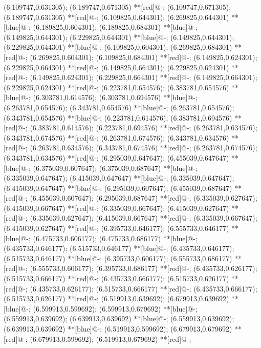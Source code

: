 (6.109747,0.631305); (6.189747,0.671305) **[red]@{-};
(6.109747,0.671305); (6.189747,0.631305) **[red]@{-};
(6.109825,0.644301); (6.269825,0.644301) **[blue]@{-};
(6.189825,0.604301); (6.189825,0.684301) **[blue]@{-};
(6.149825,0.644301); (6.229825,0.644301) **[blue]@{-};
(6.149825,0.644301); (6.229825,0.644301) **[blue]@{-};
(6.109825,0.604301); (6.269825,0.684301) **[red]@{-};
(6.269825,0.604301); (6.109825,0.684301) **[red]@{-};
(6.149825,0.624301); (6.229825,0.664301) **[red]@{-};
(6.149825,0.664301); (6.229825,0.624301) **[red]@{-};
(6.149825,0.624301); (6.229825,0.664301) **[red]@{-};
(6.149825,0.664301); (6.229825,0.624301) **[red]@{-};
(6.223781,0.654576); (6.383781,0.654576) **[blue]@{-};
(6.303781,0.614576); (6.303781,0.694576) **[blue]@{-};
(6.263781,0.654576); (6.343781,0.654576) **[blue]@{-};
(6.263781,0.654576); (6.343781,0.654576) **[blue]@{-};
(6.223781,0.614576); (6.383781,0.694576) **[red]@{-};
(6.383781,0.614576); (6.223781,0.694576) **[red]@{-};
(6.263781,0.634576); (6.343781,0.674576) **[red]@{-};
(6.263781,0.674576); (6.343781,0.634576) **[red]@{-};
(6.263781,0.634576); (6.343781,0.674576) **[red]@{-};
(6.263781,0.674576); (6.343781,0.634576) **[red]@{-};
(6.295039,0.647647); (6.455039,0.647647) **[blue]@{-};
(6.375039,0.607647); (6.375039,0.687647) **[blue]@{-};
(6.335039,0.647647); (6.415039,0.647647) **[blue]@{-};
(6.335039,0.647647); (6.415039,0.647647) **[blue]@{-};
(6.295039,0.607647); (6.455039,0.687647) **[red]@{-};
(6.455039,0.607647); (6.295039,0.687647) **[red]@{-};
(6.335039,0.627647); (6.415039,0.667647) **[red]@{-};
(6.335039,0.667647); (6.415039,0.627647) **[red]@{-};
(6.335039,0.627647); (6.415039,0.667647) **[red]@{-};
(6.335039,0.667647); (6.415039,0.627647) **[red]@{-};
(6.395733,0.646177); (6.555733,0.646177) **[blue]@{-};
(6.475733,0.606177); (6.475733,0.686177) **[blue]@{-};
(6.435733,0.646177); (6.515733,0.646177) **[blue]@{-};
(6.435733,0.646177); (6.515733,0.646177) **[blue]@{-};
(6.395733,0.606177); (6.555733,0.686177) **[red]@{-};
(6.555733,0.606177); (6.395733,0.686177) **[red]@{-};
(6.435733,0.626177); (6.515733,0.666177) **[red]@{-};
(6.435733,0.666177); (6.515733,0.626177) **[red]@{-};
(6.435733,0.626177); (6.515733,0.666177) **[red]@{-};
(6.435733,0.666177); (6.515733,0.626177) **[red]@{-};
(6.519913,0.639692); (6.679913,0.639692) **[blue]@{-};
(6.599913,0.599692); (6.599913,0.679692) **[blue]@{-};
(6.559913,0.639692); (6.639913,0.639692) **[blue]@{-};
(6.559913,0.639692); (6.639913,0.639692) **[blue]@{-};
(6.519913,0.599692); (6.679913,0.679692) **[red]@{-};
(6.679913,0.599692); (6.519913,0.679692) **[red]@{-};
